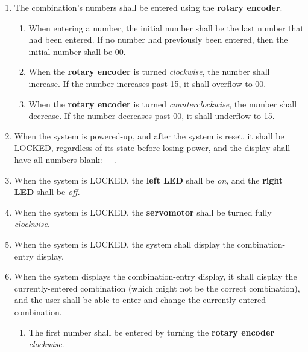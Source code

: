 \begin{enumerate}[start=\value{enumi}]
    \item The combination's numbers shall be entered using the \textbf{rotary encoder}.
        \begin{enumerate}
            \item When entering a number, the initial number shall be the last number that had been entered.
                If no number had previously been entered, then the initial number shall be 00.
            \item When the \textbf{rotary encoder} is turned \textit{clockwise}, the number shall increase.
                If the number increases past 15, it shall overflow to 00.
            \item When the \textbf{rotary encoder} is turned \textit{counterclockwise}, the number shall decrease.
                If the number decreases past 00, it shall underflow to 15.
        \end{enumerate}
    \item When the system is powered-up, and after the system is reset, it shall be LOCKED, regardless of its state before losing power,
        and the display shall have all numbers blank: \texttt{\phantom{88}-\phantom{88}-\phantom{88}}.
    \item When the system is LOCKED, the \textbf{left LED} shall be \textit{on}, and the \textbf{right LED} shall be \textit{off}.
    \item When the system is LOCKED, the \textbf{servomotor} shall be turned fully \textit{clockwise}.
    \item When the system is LOCKED, the system shall display the combination-entry display.
    \item \label{spec:enterCombination} When the system displays the combination-entry display, it shall display the currently-entered combination (which might not be the correct combination),
        and the user shall be able to enter and change the currently-entered combination.
        \begin{enumerate}
            \item The first number shall be entered by turning the \textbf{rotary encoder} \textit{clockwise}.

\end{enumerate}
\end{enumerate}
